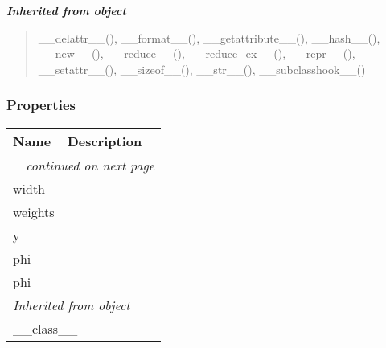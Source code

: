 \large{\textbf{\textit{Inherited from object}}}

\begin{quote}
\_\_delattr\_\_(), \_\_format\_\_(), \_\_getattribute\_\_(), \_\_hash\_\_(), \_\_new\_\_(), \_\_reduce\_\_(), \_\_reduce\_ex\_\_(), \_\_repr\_\_(), \_\_setattr\_\_(), \_\_sizeof\_\_(), \_\_str\_\_(), \_\_subclasshook\_\_()
\end{quote}


  \subsubsection{Properties}

    \vspace{-1cm}
\hspace{\varindent}\begin{longtable}{|p{\varnamewidth}|p{\vardescrwidth}|l}
\cline{1-2}
\cline{1-2} \centering \textbf{Name} & \centering \textbf{Description}& \\
\cline{1-2}
\endhead\cline{1-2}\multicolumn{3}{r}{\small\textit{continued on next page}}\\\endfoot\cline{1-2}
\endlastfoot\raggedright w\-i\-d\-t\-h\- & &\\
\cline{1-2}
\raggedright w\-e\-i\-g\-h\-t\-s\- & &\\
\cline{1-2}
\raggedright y\- & &\\
\cline{1-2}
\raggedright p\-h\-i\- & &\\
\cline{1-2}
\raggedright p\-h\-i\-2\- & &\\
\cline{1-2}
\multicolumn{2}{|l|}{\textit{Inherited from object}}\\
\multicolumn{2}{|p{\varwidth}|}{\raggedright \_\_class\_\_}\\
\cline{1-2}
\end{longtable}

